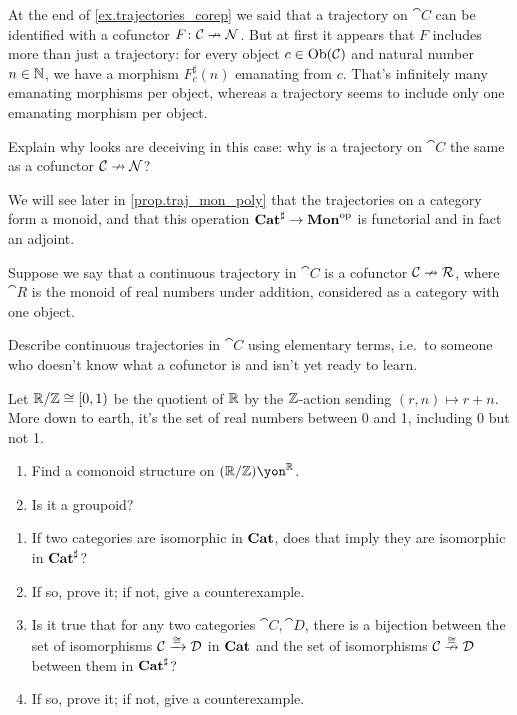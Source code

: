 \documentclass[DynamicalBook]{subfiles}
\begin{document}
\begin{exercise}
At the end of \cref{ex.trajectories_corep} we said that a trajectory on $\cat{C}$ can be identified with a cofunctor $F\colon\mathcal{C}\nrightarrow\mathcal{N}$. But at first it appears that $F$ includes more than just a trajectory: for every object $c\in\operatorname{Ob}(\mathcal{C})$ and natural number $n\in\mathbb{N}$, we have a morphism $F^\sharp_c(n)$ emanating from $c$. That's infinitely many emanating morphisms per object, whereas a trajectory seems to include only one emanating morphism per object.

Explain why looks are deceiving in this case: why is a trajectory on $\cat{C}$ the same as a cofunctor $\mathcal{C}\nrightarrow\mathcal{N}$?
\end{exercise}

We will see later in \cref{prop.traj_mon_poly} that the trajectories on a category form a monoid, and that this operation $\textbf{Cat}^\sharp\to\textbf{Mon}^{\textnormal{op}}$ is functorial and in fact an adjoint.

\begin{exercise}
Suppose we say that a continuous trajectory in $\cat{C}$ is a cofunctor $\mathcal{C}\nrightarrow\mathcal{R}$, where $\cat{R}$ is the monoid of real numbers under addition, considered as a category with one object. 

Describe continuous trajectories in $\cat{C}$ using elementary terms, i.e.\ to someone who doesn't know what a cofunctor is and isn't yet ready to learn.
\end{exercise}

\begin{exercise}
Let $\mathbb{R}/\mathbb{Z}\cong[0,1)$ be the quotient of $\mathbb{R}$ by the $\mathbb{Z}$-action sending $(r,n)\mapsto r+n$. More down to earth, it's the set of real numbers between 0 and 1, including 0 but not 1.
\begin{enumerate}
	\item Find a comonoid structure on $(\rr/\zz)\yon^\rr$.
	\item Is it a groupoid?
\qedhere
\end{enumerate}
\end{exercise}

\begin{exercise}
\begin{enumerate}
	\item If two categories are isomorphic in $\textbf{Cat}$, does that imply they are isomorphic in $\textbf{Cat}^\sharp$?
	\item If so, prove it; if not, give a counterexample.
	\item Is it true that for any two categories $\cat{C},\cat{D}$, there is a bijection between the set of isomorphisms $\mathcal{C}\xrightarrow{\cong}\mathcal{D}$ in $\textbf{Cat}$ and the set of isomorphisms $\mathcal{C}\overset{\cong}{\nrightarrow}\mathcal{D}$ between them in $\textbf{Cat}^\sharp$?
	\item If so, prove it; if not, give a counterexample.
\qedhere
\end{enumerate}
\end{exercise}
\end{document}

